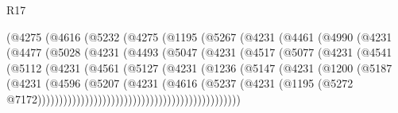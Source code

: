 \begin{lexlean}{R17}
\begin{coremodule}
                    (@4275
                      (@4616
                        (@5232
                          (@4275
                            (@1195
                              (@5267
                                (@4231
                                  (@4461
                                    (@4990
                                      (@4231
                                        (@4477
                                          (@5028
                                            (@4231
                                              (@4493
                                                (@5047
                                                  (@4231
                                                    (@4517
                                                      (@5077
                                                        (@4231
                                                          (@4541
                                                            (@5112
                                                              (@4231
                                                                (@4561
                                                                  (@5127
                                                                    (@4231
                                                                      (@1236
                                                                        (@5147
                                                                          (@4231
                                                                            (@1200
                                                                              (@5187
                                                                                (@4231
                                                                                  (@4596
                                                                                    (@5207
                                                                                      (@4231
                                                                                        (@4616
                                                                                          (@5237
                                                                                            (@4231
                                                                                              (@1195
                                                                                                (@5272
                                                                                                  @7172)))))))))))))))))))))))))))))))))))))))))))))))

\end{coremodule}
\end{lexlean}
